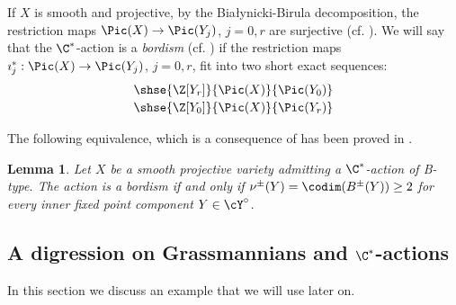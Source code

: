 \documentclass[reqno]{amsproc}
\newtheorem{lemma}[theorem]{Lemma}
\theoremstyle{definition}
\begin{document}
If $X$ is smooth and projective, by the Bia{\l}ynicki-Birula decomposition, the restriction maps $\Pic(X)\to \Pic(Y_j)$, $j=0,r$ are surjective (cf. \cite[Theorem~3]{wors6-CS79}). We will say that the $\C^*$-action is a {\em bordism} (cf. \cite[Definition~3.8]{wors6-WORS1}) if the restriction maps $\imath_j^*:\Pic(X)\to \Pic(Y_j)$, $j=0,r$, fit into two short exact sequences:
$$
\begin{array}{c}
\shse{\Z[Y_r]}{\Pic(X)}{\Pic(Y_0)}
\\[2pt]
\shse{\Z[Y_0]}{\Pic(X)}{\Pic(Y_r)}
\end{array}
$$

The following equivalence, which is a consequence of \cite[Theorem~3]{wors6-CS79} has been proved in \cite[Corollary~3.7]{wors6-WORS1}.
\begin{lemma}\label{wors6:lem:bordism} Let $X$ be a smooth projective variety admitting a $\C^*$-action of B-type. The action is a bordism if and only if $\nu^\pm(Y)=\codim(B^\pm(Y))\geq 2$ for every inner fixed point component $Y\in\cY^\circ$. 
\end{lemma}


\subsection{A digression on Grassmannians and $\C^*$-actions}\label{wors6:ssec:grass}
 
In this section we discuss an example that we will use later on. 
\end{document}
